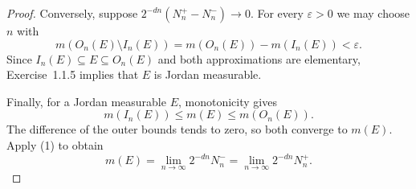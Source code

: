 \begin{proof}
Conversely, suppose $2^{-dn}(N_n^+-N_n^-)\to0$.
For every $\varepsilon>0$ we may choose $n$ with
\[
m(O_n(E)\setminus I_n(E))
=m(O_n(E))-m(I_n(E))<\varepsilon.
\]
Since $I_n(E)\subseteq E\subseteq O_n(E)$ and both approximations
are elementary, Exercise~1.1.5 implies that $E$ is Jordan measurable.

Finally, for a Jordan measurable $E$, monotonicity gives
\[
m(I_n(E))\leq m(E)\leq m(O_n(E)).
\]
The difference of the outer bounds tends to zero, so both
converge to $m(E)$. Apply (1) to obtain
\[
\displaystyle
m(E)=\lim_{n\to\infty}2^{-dn}N_n^-
=\lim_{n\to\infty}2^{-dn}N_n^+.
\]
\end{proof}
